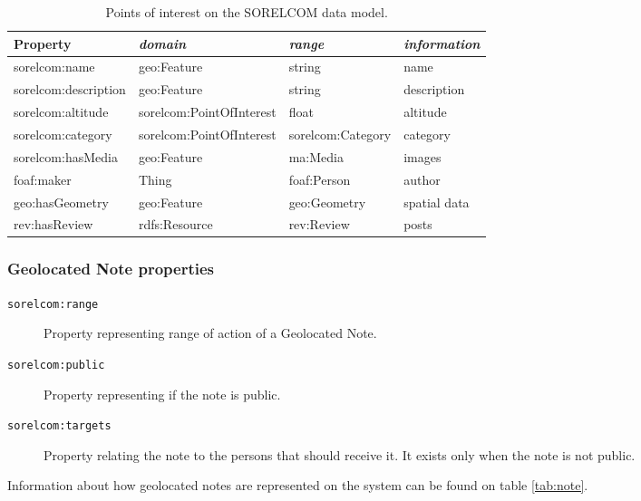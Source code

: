 \begin{table}[ht]
  \centering
  \caption{Points of interest on the SORELCOM data model.}\label{tab:poi}
  \begin{tabular}{llll}
    \toprule
      \textbf{Property} & \emph{domain}  & \emph{range} & \emph{information}\\
    \midrule
      sorelcom:name & geo:Feature  & string & name \\
      sorelcom:description & geo:Feature & string  & description \\
      sorelcom:altitude & sorelcom:PointOfInterest & float & altitude \\
      sorelcom:category & sorelcom:PointOfInterest & sorelcom:Category & category \\
      sorelcom:hasMedia & geo:Feature & ma:Media & images \\
      foaf:maker & Thing & foaf:Person & author \\
      geo:hasGeometry & geo:Feature & geo:Geometry & spatial data \\
      rev:hasReview & rdfs:Resource & rev:Review & posts \\
    \bottomrule
  \end{tabular}
\end{table}

\subsubsection*{Geolocated Note properties}

\begin{description}
\item[\texttt{sorelcom:range}] Property representing range of action of a Geolocated Note. 
\item[\texttt{sorelcom:public}] Property representing if the note is public.
\item[\texttt{sorelcom:targets}] Property relating the note to the persons that should receive it. It exists only when the note is not public.
\end{description}

Information about how geolocated notes are represented on the system can be found on table \ref{tab:note}.

